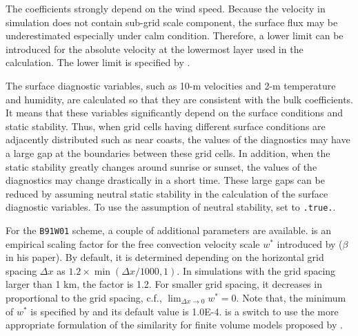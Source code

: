 The coefficients strongly depend on the wind speed.
Because the velocity in simulation does not contain sub-grid scale component, the surface flux may be underestimated especially under calm condition.
Therefore, a lower limit can be introduced for the absolute velocity at the lowermost layer used in the calculation.
The lower limit is specified by .

The surface diagnostic variables, such as 10-m velocities and 2-m temperature and humidity, are calculated so that they are consistent with the bulk coefficients.
It means that these variables significantly depend on the surface conditions and static stability.
Thus, when grid cells having different surface conditions are adjacently distributed such as near coasts, the values of the diagnostics may have a large gap at the boundaries between these grid cells.
In addition, when the static stability greatly changes around sunrise or sunset, the values of the diagnostics may change drastically in a short time.
These large gaps can be reduced by assuming neutral static stability in the calculation of the surface diagnostic variables.
To use the assumption of neutral stability, set  to \verb|.true.|.


For the \verb|B91W01| scheme, a couple of additional parameters are available.
 is an empirical scaling factor for the free convection velocity scale $w^{\ast}$ introduced by \citet{beljaars_1994} ($\beta$ in his paper).
By default, it is determined depending on the horizontal grid spacing $\Delta x$ as $1.2 \times \min(\Delta x/1000, 1)$.
In simulations with the grid spacing larger than 1 km, the factor is 1.2.
For smaller grid spacing, it decreases in proportional to the grid spacing, c.f., $\lim_{\Delta x \to 0} w^{\ast} = 0$.
Note that, the minimum of $w^{\ast}$ is specified by  and its default value is 1.0E-4.
 is a switch to use the more appropriate formulation of the similarity for finite volume models proposed by \citet{nishizawa_2018}.
